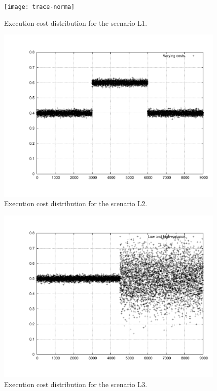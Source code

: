 \documentclass[times, 10pt,twocolumn]{article}
\begin{document}
\begin{figure}[t]
  \centering
  \texttt{[image: trace-norma]}
  \caption{Execution cost distribution for the scenario L1.}
  \label{fig:plotl1}
\end{figure}

\begin{figure}[t]
  \centering
  \includegraphics[scale=0.33]{trace-trifasico}
  \caption{Execution cost distribution for the scenario L2.}
  \label{fig:plotl2}
\end{figure}

\begin{figure}[t]
  \centering
  \includegraphics[scale=0.33]{trace-variance}
  \caption{Execution cost distribution for the scenario L3.}
  \label{fig:plotl3}
\end{figure}
\end{document}
